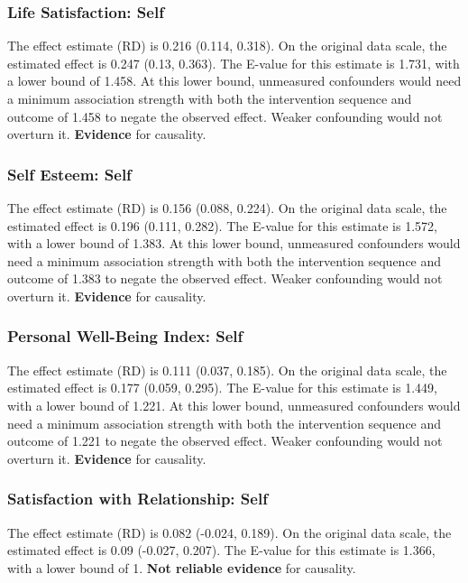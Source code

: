 \documentclass[
  singlecolumn]{article}
\begin{document}
\subsubsection{Life Satisfaction: Self}\label{life-satisfaction-self-13}

The effect estimate (RD) is 0.216 (0.114, 0.318). On the original data
scale, the estimated effect is 0.247 (0.13, 0.363). The E-value for this
estimate is 1.731, with a lower bound of 1.458. At this lower bound,
unmeasured confounders would need a minimum association strength with
both the intervention sequence and outcome of 1.458 to negate the
observed effect. Weaker confounding would not overturn it.
\textbf{Evidence} for causality.

\subsubsection{Self Esteem: Self}\label{self-esteem-self-13}

The effect estimate (RD) is 0.156 (0.088, 0.224). On the original data
scale, the estimated effect is 0.196 (0.111, 0.282). The E-value for
this estimate is 1.572, with a lower bound of 1.383. At this lower
bound, unmeasured confounders would need a minimum association strength
with both the intervention sequence and outcome of 1.383 to negate the
observed effect. Weaker confounding would not overturn it.
\textbf{Evidence} for causality.

\subsubsection{Personal Well-Being Index:
Self}\label{personal-well-being-index-self-13}

The effect estimate (RD) is 0.111 (0.037, 0.185). On the original data
scale, the estimated effect is 0.177 (0.059, 0.295). The E-value for
this estimate is 1.449, with a lower bound of 1.221. At this lower
bound, unmeasured confounders would need a minimum association strength
with both the intervention sequence and outcome of 1.221 to negate the
observed effect. Weaker confounding would not overturn it.
\textbf{Evidence} for causality.

\subsubsection{Satisfaction with Relationship:
Self}\label{satisfaction-with-relationship-self-13}

The effect estimate (RD) is 0.082 (-0.024, 0.189). On the original data
scale, the estimated effect is 0.09 (-0.027, 0.207). The E-value for
this estimate is 1.366, with a lower bound of 1. \textbf{Not reliable
evidence} for causality.
\end{document}

